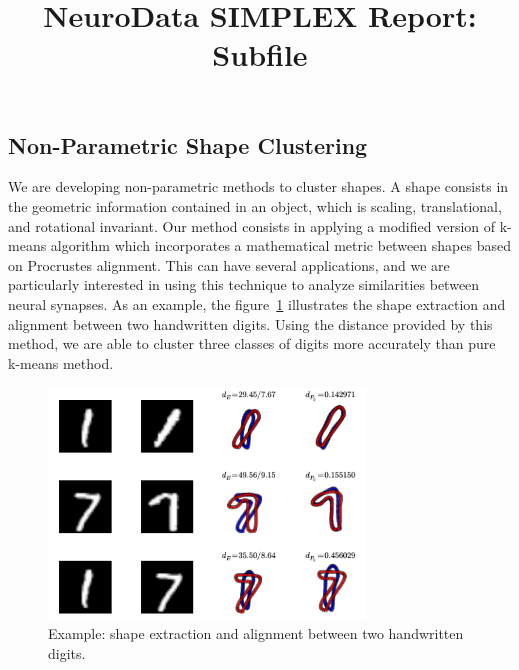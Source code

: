 \documentclass[simplex.tex]{subfiles}
\title{NeuroData SIMPLEX Report: Subfile}
\begin{document}

\subsection{Non-Parametric Shape Clustering}

We are developing non-parametric methods to cluster shapes. A shape
consists in the geometric information contained in an object, which
is scaling, translational, and rotational invariant. Our method consists
in applying a modified version of k-means algorithm which incorporates a
mathematical metric between shapes based on Procrustes alignment. This
can have several applications, and we are particularly interested in
using this technique to analyze similarities between neural synapses. As
an example, the figure~\ref{fig:nonparShape} illustrates the shape extraction and
alignment between two handwritten digits. Using the distance provided by
this method, we are able to cluster three classes of digits more
accurately than pure k-means method. 

\begin{figure}[h!]
\begin{cframed}
\centering
\includegraphics[width=0.75\textwidth]{../../figs/nonparShape.png}
\caption{
 Example: shape extraction and alignment between two handwritten digits.
}
\label{fig:nonparShape}
\end{cframed}
\end{figure}
\end{document}
